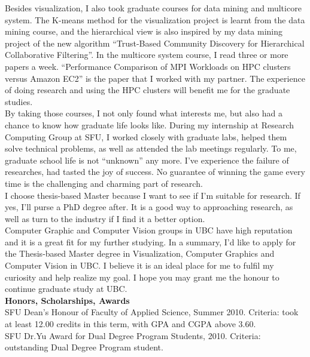 \documentclass{article}
\begin{document}
Besides visualization, I also took graduate courses for data mining and multicore system. The K-means method for the visualization project is learnt from the data mining course, and the hierarchical view is also inspired by my data mining project of the new algorithm ``Trust-Based Community Discovery for Hierarchical Collaborative Filtering''. In the multicore system course, I read three or more papers a week. ``Performance Comparison of MPI Workloads on HPC clusters versus Amazon EC2'' is the paper that I worked with my partner. The experience of doing research and using the HPC clusters will benefit me for the graduate studies.  \\


By taking those courses, I not only found what interests me, but also had a chance to know how graduate life looks like. During my internship at Research Computing Group at SFU, I worked closely with graduate labs, helped them solve technical problems, as well as attended the lab meetings regularly. To me, graduate school life is not ``unknown'' any more. I've experience the failure of researches, had tasted the joy of success. No guarantee of winning the game every time is the challenging and charming part of research. \\

I choose thesis-based Master because I want to see if I'm suitable for research. If yes, I'll purse a PhD degree after. It is a good way to approaching research, as well as turn to the industry if I find it a better option.\\

Computer Graphic and Computer Vision groups in UBC have high reputation and it is a great fit for my further studying. In a summary, I'd like to apply for the Thesis-based Master degree in Visualization, Computer Graphics and Computer Vision in UBC. I believe it is an ideal place for me to fulfil my curiosity and help realize my goal. I hope you may grant me the honour to continue graduate study at UBC.  \\

{\bf Honors, Scholarships, Awards}\\

SFU Dean's Honour of Faculty of Applied Science, Summer 2010. Criteria: took at least 12.00 credits in this term, with GPA and CGPA above 3.60. \\

SFU Dr.Yu Award for Dual Degree Program Students, 2010. Criteria: outstanding Dual Degree Program student. \\
\end{document}
